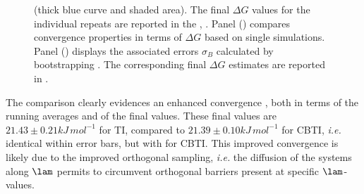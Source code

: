 \begin{figure}
{                     (thick blue curve and shaded area).
%
The final $\Delta G$ values for the individual 
    repeats are reported in the ,
.
%
    Panel () compares convergence properties in terms of $\Delta G$  
    based on single simulations.
    Panel () displays the associated errors $\sigma_B$ calculated by bootstrapping .
%
    The corresponding final $\Delta G$ estimates are reported in .
  }
\label{fig:conv:pts}
\end{figure}


The comparison clearly evidences an enhanced convergence ,
both in terms of the running averages and of the final values.
%
These final values are $21.43\pm0.21\unit{kJ\,mol^{-1}}$ for TI, compared to $21.39\pm0.10\unit{kJ\,mol^{-1}}$ for CBTI,
{\em i.e.} identical within error bars, but with 
for CBTI.
%
This improved convergence is likely due to the improved orthogonal sampling,
{\em i.e.} the diffusion of the systems along $\lam$ permits to circumvent orthogonal
barriers present at specific $\lam$-values.


